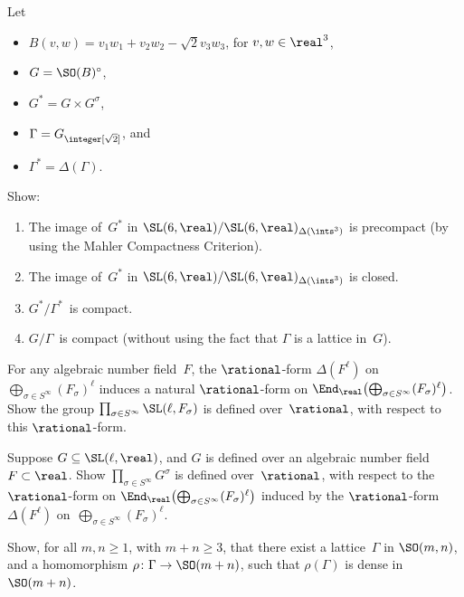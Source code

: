 \begin{exercises}
\item \label{SO(B)Z2cocpt(Mahler)}
 Let 
 \begin{itemize}
 \item $B(v,w) = v_1 w_1 + v_2 w_2 - \sqrt{2} v_3 w_3$, for
$v,w \in \real^3$,
 \item $G = \SO(B)^\circ$,
 \item $G^* = G \times G^\sigma$,
 \item $\Gamma = G_{\integer[\sqrt{2}]}$,
 and 
 \item $\Gamma^* = \Delta(\Gamma)$.
 \end{itemize}
 Show:
 \begin{enumerate}
 \item The image of~$G^*$ in $\SL(6,\real) /
\SL(6,\real)_{\Delta(\ints^3)}$ is precompact (by using
the Mahler Compactness Criterion).
 \item The image of~$G^*$ in $\SL(6,\real) /
\SL(6,\real)_{\Delta(\ints^3)}$ is closed.
 \item $G^*/\Gamma^*$~is compact.
 \item $G/\Gamma$~is compact (without using the fact that 
$\Gamma$ is a lattice in~$G$).
 \end{enumerate}

\item \label{SLnFsigma/Q}
 For any algebraic number field~$F$,
the $\rational$-form $\Delta(F^\ell)$ on $\bigoplus_{\sigma \in
S^\infty} (F_{\sigma})^\ell$ induces a natural $\rational$-form on $\End_{\real} \bigl( \bigoplus_{\sigma
\in S^\infty} (F_{\sigma})^\ell \bigr)$.
 Show the group
 $\prod_{\sigma \in S^\infty} \SL(\ell,F_\sigma)$ is
defined over~$\rational$, with respect to this $\rational$-form.

\item Suppose $G \subseteq \SL(\ell,\real)$, and $G$ is
defined over an algebraic number field $F \subset \real$. Show
$\prod_{\sigma \in S^\infty} G^\sigma$ is defined
over~$\rational$, with respect to the
$\rational$-form on $\End_{\real} \bigl( \bigoplus_{\sigma
\in S^\infty} (F_{\sigma})^\ell \bigr)$ induced by the
$\rational$-form $\Delta(F^\ell)$ on~$\bigoplus_{\sigma \in
S^\infty} (F_{\sigma})^\ell$.

\item \label{DenseProjSO(n)}
 Show, for all $m,n \ge 1$, with $m + n \ge 3$, that there exist 
a lattice~$\Gamma$ in $\SO(m,n)$,
 and
 a homomorphism $\rho \colon \Gamma \to \SO(m+n)$,
 such that $\rho(\Gamma)$ is dense in $\SO(m+n)$.

\end{exercises}


